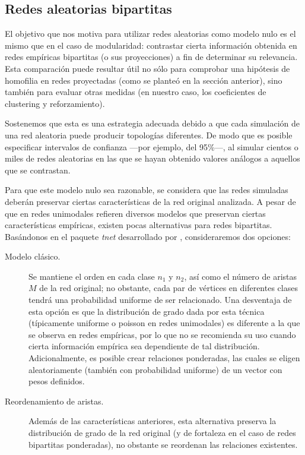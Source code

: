 \documentclass[letterpaper, 11pt]{book}
\theoremstyle{definition}
\theoremstyle{remark}
\begin{document}
\subsection{Redes aleatorias bipartitas}
\label{sec:Redes_aleatorias_bipartitas}

El objetivo que nos motiva para utilizar redes aleatorias como modelo nulo es el mismo que en el caso de modularidad: contrastar cierta información obtenida en redes empíricas bipartitas (o sus proyecciones) a fin de determinar su relevancia. 
Esta comparación puede resultar útil no sólo para comprobar una hipótesis de homofilia en redes proyectadas (como se planteó en la sección anterior), sino también para evaluar otras medidas (en nuestro caso, los coeficientes de clustering y reforzamiento). 


Sostenemos que esta es una estrategia adecuada debido a que cada simulación de una red aleatoria puede producir topologías diferentes. 
De modo que es posible especificar intervalos de confianza ---por ejemplo, del 95\%---, al simular cientos o miles de redes aleatorias en las que se hayan obtenido valores análogos a aquellos que se contrastan. 

Para que este modelo nulo sea razonable, se considera que las redes simuladas deberán preservar ciertas características de la red original analizada. 
A pesar de que en redes unimodales \citet{2002_Barabasi_MechanicsOfComplexNetworks} refieren diversos modelos que preservan ciertas características empíricas, existen pocas alternativas para redes bipartitas. 
Basándonos en el paquete \emph{tnet} desarrollado por \citet{2015_Ophsal_tnet}, consideraremos dos opciones:
\begin{description}
    \item[Modelo clásico.] Se mantiene el orden en cada clase $n_{1}$ y $n_{2}$, así como el número de  aristas $M$ de la red original; no obstante, cada par de vértices en diferentes clases tendrá una probabilidad uniforme de ser relacionado. Una desventaja de esta opción es que la distribución de grado dada por esta técnica (típicamente uniforme o poisson en redes unimodales) es diferente a la que se observa en redes empíricas, por lo que no se recomienda su uso cuando cierta información empírica sea dependiente de tal distribución. Adicionalmente, es posible crear relaciones ponderadas, las cuales se eligen aleatoriamente (también con probabilidad uniforme) de un vector con pesos definidos. 
    \item[Reordenamiento de aristas.] Además de las características anteriores, esta alternativa preserva la distribución de grado de la red original (y de fortaleza en el caso de redes bipartitas ponderadas), no obstante se reordenan las relaciones existentes. 
\end{description} 
\end{document}
